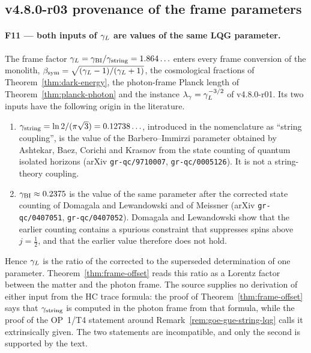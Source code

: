 \subsection*{v4.8.0-r03 provenance of the frame parameters}
\label{subsec:v480-r03-frame-parameter-provenance}

\paragraph{F11 --- both inputs of \(\gamma_L\) are values of the same LQG parameter.}
The frame factor \(\gamma_L=\gamma_{\mathrm{BI}}/\gamma_{\mathrm{string}}=1.864\ldots\) enters every frame conversion of the monolith,
\(\beta_{\mathrm{sym}}=\sqrt{(\gamma_L-1)/(\gamma_L+1)}\), the cosmological fractions of
Theorem~\ref{thm:dark-energy}, the photon-frame Planck length of
Theorem~\ref{thm:planck-photon} and the instance \(\lambda_\gamma=\gamma_L^{-3/2}\) of
v4.8.0-r01.  Its two inputs have the following origin in the literature.
\begin{enumerate}[leftmargin=2em]
 \item \(\gamma_{\mathrm{string}}=\ln2/(\pi\sqrt3)=0.12738\ldots\), introduced in the nomenclature as
 ``string coupling'', is the value of the Barbero--Immirzi parameter obtained by Ashtekar, Baez,
 Corichi and Krasnov from the state counting of quantum isolated horizons
 (arXiv \texttt{gr-qc/9710007}, \texttt{gr-qc/0005126}).  It is not a string-theory coupling.
 \item \(\gamma_{\mathrm{BI}}\approx0.2375\) is the value of the same parameter after the corrected state
 counting of Domagala and Lewandowski and of Meissner (arXiv \texttt{gr-qc/0407051},
 \texttt{gr-qc/0407052}).  Domagala and Lewandowski show that the earlier counting contains a
 spurious constraint that suppresses spins above \(j=\tfrac12\), and that the earlier value
 therefore does not hold.
\end{enumerate}
Hence \(\gamma_L\) is the ratio of the corrected to the superseded determination of one parameter.
Theorem~\ref{thm:frame-offset} reads this ratio as a Lorentz factor between the matter and the
photon frame.  The source supplies no derivation of either input from the HC trace formula: the
proof of Theorem~\ref{thm:frame-offset} says that \(\gamma_{\mathrm{string}}\) is computed in the photon frame
from that formula, while the proof of the OP~1/T4 statement around
Remark~\ref{rem:goe-gue-string-lqg} calls it extrinsically given.  The two statements are
incompatible, and only the second is supported by the text.

